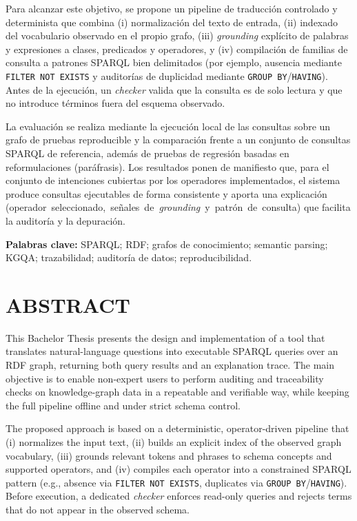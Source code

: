 \documentclass[12pt,a4paper]{article}
\begin{document}
Para alcanzar este objetivo, se propone un pipeline de traducción controlado y determinista que combina (i) normalización del texto de entrada, (ii) indexado del vocabulario observado en el propio grafo, (iii) \emph{grounding} explícito de palabras y expresiones a clases, predicados y operadores, y (iv) compilación de familias de consulta a patrones SPARQL bien delimitados (por ejemplo, ausencia mediante \texttt{FILTER NOT EXISTS} y auditorías de duplicidad mediante \texttt{GROUP BY}/\texttt{HAVING}). Antes de la ejecución, un \emph{checker} valida que la consulta es de solo lectura y que no introduce términos fuera del esquema observado.

La evaluación se realiza mediante la ejecución local de las consultas sobre un grafo de pruebas reproducible y la comparación frente a un conjunto de consultas SPARQL de referencia, además de pruebas de regresión basadas en reformulaciones (paráfrasis). Los resultados ponen de manifiesto que, para el conjunto de intenciones cubiertas por los operadores implementados, el sistema produce consultas ejecutables de forma consistente y aporta una explicación \mbox{(operador seleccionado, señales de \emph{grounding} y patrón de consulta)} que facilita la auditoría y la depuración.

\vspace{0.6cm}
\noindent\textbf{Palabras clave:} SPARQL; RDF; grafos de conocimiento; semantic parsing; KGQA; trazabilidad; auditoría de datos; reproducibilidad.

\clearpage
\thispagestyle{empty}
\null
\clearpage

\thispagestyle{plain}
\section*{ABSTRACT}
\noindent
This Bachelor Thesis presents the design and implementation of a tool that translates natural-language questions into executable SPARQL queries over an RDF graph, returning both query results and an explanation trace. The main objective is to enable non-expert users to perform auditing and traceability checks on knowledge-graph data in a repeatable and verifiable way, while keeping the full pipeline offline and under strict schema control.

The proposed approach is based on a deterministic, operator-driven pipeline that (i) normalizes the input text, (ii) builds an explicit index of the observed graph vocabulary, (iii) grounds relevant tokens and phrases to schema concepts and supported operators, and (iv) compiles each operator into a constrained SPARQL pattern (e.g., absence via \texttt{FILTER NOT EXISTS}, duplicates via \texttt{GROUP BY}/\texttt{HAVING}). Before execution, a dedicated \emph{checker} enforces read-only queries and rejects terms that do not appear in the observed schema.
\end{document}
